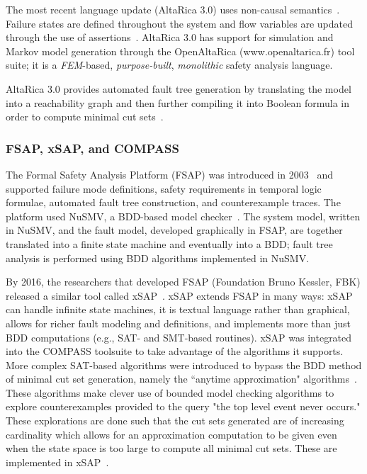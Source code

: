 The most recent language update (AltaRica 3.0) uses non-causal semantics~\cite{prosvirnova2013compilationfaulttrees,PROSVIRNOVA2013127}. Failure states are defined throughout the system and flow variables are updated through the use of assertions~\cite{Bieber04safetyassessment}.  AltaRica 3.0 has support for simulation and Markov model generation through the OpenAltaRica (www.openaltarica.fr) tool suite; it is a {\em FEM}-based, {\em purpose-built}, {\em monolithic} safety analysis language. 

AltaRica 3.0 provides automated fault tree generation by translating the model into a reachability graph and then further compiling it into Boolean formula in order to compute minimal cut sets~\cite{prosvirnova2015automated}. 

\subsubsection{FSAP, xSAP, and COMPASS}
The Formal Safety Analysis Platform (FSAP) was introduced in 2003~\cite{bozzano2003improving} and supported failure mode definitions, safety requirements in temporal logic formulae, automated fault tree construction, and counterexample traces. The platform used NuSMV, a BDD-based model checker~\cite{Cimatti2000}. The system model, written in NuSMV, and the fault model, developed graphically in FSAP, are together translated into a finite state machine and eventually into a BDD; fault tree analysis is performed using BDD algorithms implemented in NuSMV. 

By 2016, the researchers that developed FSAP (Foundation Bruno Kessler, FBK) released a similar tool called xSAP~\cite{DBLP:conf/tacas/BittnerBCCGGMMZ16}. xSAP extends FSAP in many ways: xSAP can handle infinite state machines, it is textual language rather than graphical, allows for richer fault modeling and definitions, and implements more than just BDD computations (e.g., SAT- and SMT-based routines). xSAP was integrated into the COMPASS toolsuite to take advantage of the algorithms it supports. More complex SAT-based algorithms were introduced to bypass the BDD method of minimal cut set generation, namely the ``anytime approximation" algorithms~\cite{CAV2015:BoCiGrMa, mattarei2016scalable}. These algorithms make clever use of bounded model checking algorithms to explore counterexamples provided to the query "the top level event never occurs." These explorations are done such that the cut sets generated are of increasing cardinality which allows for an approximation computation to be given even when the state space is too large to compute all minimal cut sets. These are implemented in xSAP~\cite{CAV2015:BoCiGrMa}.

